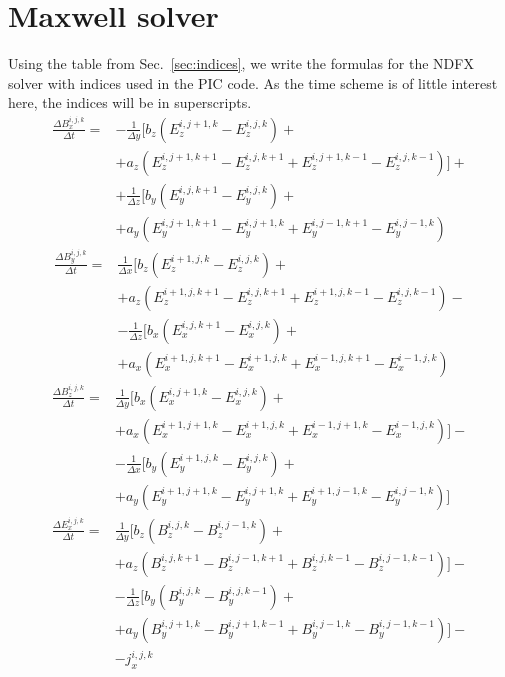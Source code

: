 \documentclass[12pt,a4paper,DIV=calc]{scrartcl}
\begin{document}
\section{Maxwell solver}
Using the table from Sec.~\ref{sec:indices}, we write the formulas for the NDFX solver with indices used in the PIC code.
As the time scheme is of little interest here, the indices will be in superscripts. 
\begin{align}
    \frac{\Delta B_x^{i,j,k}}{\Delta t} = &-\frac{1}{\Delta y}\big[b_z \left(E_z^{i,j+1,k} - E_z^{i,j,k} \right) + \nonumber \\
    &+a_z \left(E_z^{i,j+1,k+1} - E_z^{i,j,k+1} + E_z^{i,j+1,k-1} - E_z^{i,j,k-1}\right)\big] + \nonumber \\
    &+\frac{1}{\Delta z} \big[b_y \left(E_y^{i,j,k+1} - E_y^{i,j,k}\right) + \nonumber \\
    &+a_y \left(E_y^{i,j+1,k+1}-E_y^{i,j+1,k} + E_y^{i,j-1,k+1} - E_y^{i,j-1,k}\right)
\end{align}
\begin{align}
    \frac{\Delta B_y^{i,j,k}}{\Delta t} = &\frac{1}{\Delta x}\big[b_z \left(E_z^{i+1,j,k} - E_z^{i,j,k} \right) + \nonumber \\
    &+a_z \left(E_z^{i+1,j,k+1} - E_z^{i,j,k+1} + E_z^{i+1,j,k-1} - E_z^{i,j,k-1}\right) - \nonumber \\
    &-\frac{1}{\Delta z} \big[ b_x \left(E_x^{i,j,k+1} - E_x^{i,j,k}\right) + \nonumber \\
    &+a_x \left(E_x^{i+1,j,k+1} - E_x^{i+1,j,k} + E_x^{i-1,j,k+1} - E_x^{i-1,j,k}\right)
\end{align}
\begin{align}
    \frac{\Delta B_z^{i,j,k}}{\Delta t} = &\frac{1}{\Delta y}\big[b_x\left(E_x^{i,j+1,k} - E_x^{i,j,k} \right) + \nonumber \\
    &+a_x \left(E_x^{i+1,j+1,k} - E_x^{i+1,j,k} + E_x^{i-1,j+1,k} - E_x^{i-1,j,k}\right) \big] - \nonumber \\
    &-\frac{1}{\Delta x} \big[ b_y \left(E_y^{i+1,j,k} - E_y^{i,j,k}\right) + \nonumber \\
    &+a_y \left(E_y^{i+1,j+1,k} - E_y^{i,j+1,k} + E_y^{i+1,j-1,k} - E_y^{i,j-1,k} \right) \big]
\end{align}
\begin{align}
    \frac{\Delta E_x^{i,j,k}}{\Delta t} = &\frac{1}{\Delta y}\big[b_z \left(B_z^{i,j,k} - B_z^{i,j-1,k} \right) + \nonumber\\
    &+ a_z \left(B_z^{i,j,k+1} - B_z^{i,j-1,k+1} + B_z^{i,j,k-1} - B_z^{i,j-1,k-1}\right) \big] - \nonumber\\
    &- \frac{1}{\Delta z}\big[ b_y \left(B_y^{i,j,k}-B_y^{i,j,k-1}\right) + \nonumber\\
    &+ a_y \left(B_y^{i,j+1,k} - B_y^{i,j+1,k-1} + B_y^{i,j-1,k} - B_y^{i,j-1,k-1}\right) \big] - \nonumber\\
    &- j_x^{i,j,k}
\end{align}
\end{document}
